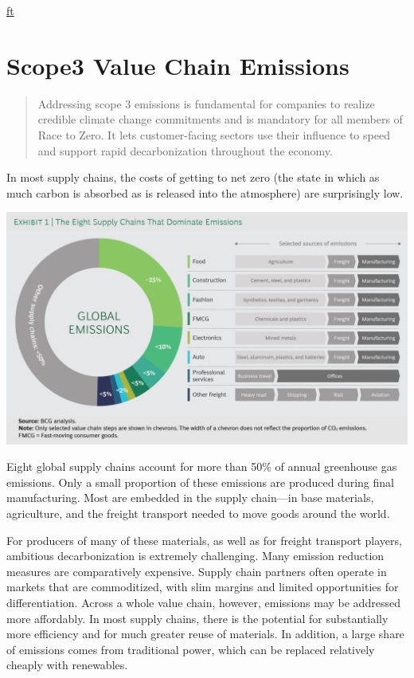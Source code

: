 \documentclass[
]{book}
\begin{document}
\href{https://www.ft.com/content/b45113f8-5b5b-4f3e-a450-0a2b100595f6?shareType=nongift}{ft}

\hypertarget{scope3-value-chain-emissions}{%
\section{Scope3 Value Chain Emissions}\label{scope3-value-chain-emissions}}

\begin{quote}
Addressing scope 3 emissions is fundamental for companies to realize credible climate change commitments and is mandatory for all members of Race to Zero. It lets customer-facing sectors use their influence to speed and support rapid decarbonization throughout the economy.
\end{quote}

In most supply chains, the costs of getting to net zero (the state in which as much carbon is absorbed as is released into the atmosphere) are surprisingly low.

\includegraphics{fig/bcg_8supply_chains.png}

Eight global supply chains account for more than 50\% of annual greenhouse gas emissions. Only a small proportion of these emissions are produced during final manufacturing. Most are embedded in the supply chain---in base materials, agriculture, and the freight transport needed to move goods around the world.

For producers of many of these materials, as well as for freight transport players, ambitious decarbonization is extremely challenging. Many emission reduction measures are comparatively expensive. Supply chain partners often operate in markets that are commoditized, with slim margins and limited opportunities for differentiation. Across a whole value chain, however, emissions may be addressed more affordably. In most supply chains, there is the potential for substantially more efficiency and for much greater reuse of materials.
In addition, a large share of emissions comes from traditional power, which can be replaced relatively cheaply with renewables.
\end{document}
